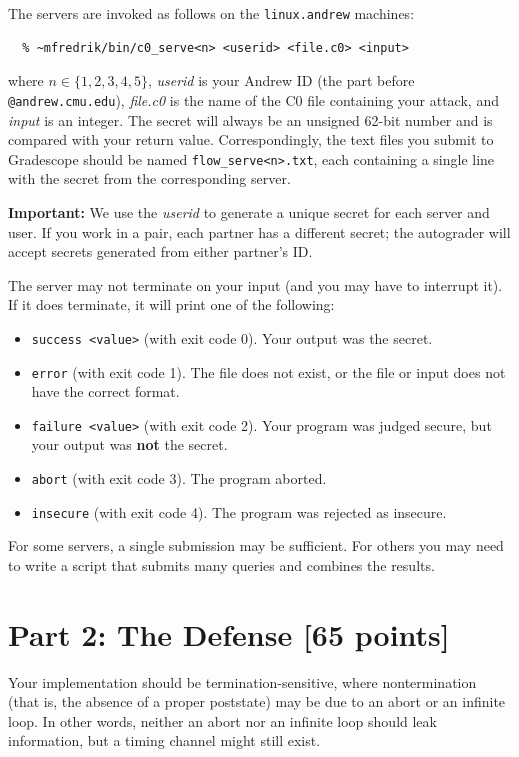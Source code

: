 \documentclass[11pt]{article}
\begin{document}
The servers are invoked as follows on the \verb'linux.andrew' machines:
\begin{verbatim}
  % ~mfredrik/bin/c0_serve<n> <userid> <file.c0> <input>
\end{verbatim}
where $n \in \{1,2,3,4,5\}$, \emph{userid} is your Andrew ID (the part before
\texttt{@andrew.cmu.edu}), \emph{file.c0} is the name of the C0 file
containing your attack, and \emph{input} is an integer.  The secret will
always be an unsigned 62-bit number and is compared with your return value.
Correspondingly, the text files you submit to Gradescope should be named
\verb'flow_serve<n>.txt', each containing a single line with the secret from the
corresponding server.

\textbf{Important:} We use the \emph{userid} to generate a unique secret for
each server and user.  If you work in a pair, each partner has a different
secret; the autograder will accept secrets generated from either partner's ID.

The server may not terminate on your input (and you may have to interrupt it).
If it does terminate, it will print one of the following:
\begin{itemize}
  \item \verb'success <value>' (with exit code 0).  Your output was the secret.
  \item \verb'error' (with exit code 1).  The file does not exist, or
    the file or input does not have the correct format.
  \item \verb'failure <value>' (with exit code 2).  Your program was judged
    secure, but your output was \textbf{not} the secret.
  \item \verb'abort' (with exit code 3).  The program aborted.
  \item \verb'insecure' (with exit code 4).  The program was rejected as insecure.
\end{itemize}

For some servers, a single submission may be sufficient.  For others you may
need to write a script that submits many queries and combines the results.

\section{Part 2: The Defense [65 points]}

Your implementation should be termination-sensitive, where nontermination (that
is, the absence of a proper poststate) may be due to an abort or an infinite
loop.  In other words, neither an abort nor an infinite loop should leak
information, but a timing channel might still exist.
\end{document}
